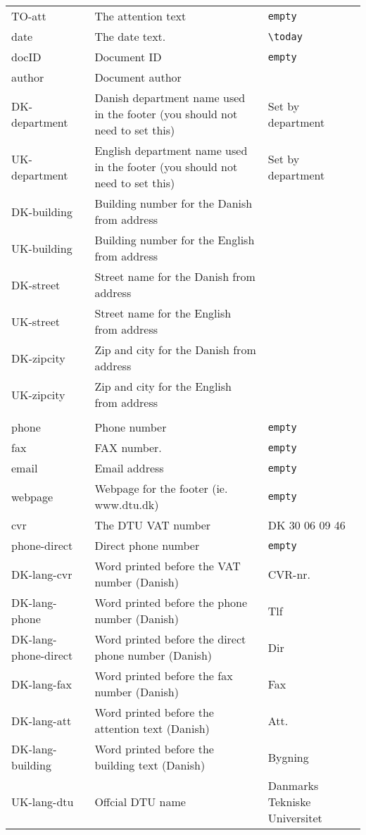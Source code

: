 \documentclass{dtuletter}
\newcommand{\optempty}{{\rmfamily\texttt{empty}}}
\begin{document}
\begin{longtable}{>{\ttfamily}l >{\raggedright}p{} >{\ttfamily}p{}}
TO-att		& The attention text & \optempty\\
date 		& The date text. & \verb,\today,\\
docID  		& Document ID & \optempty\\
author 		& Document author &\optempty\\
DK-department 	& Danish department name used in the footer (you should not need to set this) & Set by department  \\
UK-department 	& English department name used in the footer (you should not need to set this) & Set by department  \\
DK-building 	& Building number for the Danish from address &\optempty\\
UK-building 	& Building number for the English from address &\optempty\\
DK-street 		& Street name for the Danish from address &\optempty\\
UK-street 		& Street name for the English from address &\optempty\\
DK-zipcity 		& Zip and city for the Danish from address &\optempty\\
UK-zipcity 		& Zip and city for the English from address &\optempty\\\\
phone			& Phone number & \optempty\\
fax				& FAX number. & \optempty\\
email 			& Email address & \optempty\\
webpage			& Webpage for the footer (ie. www.dtu.dk) & \optempty\\
cvr 			& The DTU VAT number & DK 30 06 09 46\\
phone-direct	& Direct phone number & \optempty\\
%
%
DK-lang-cvr 			& Word printed before the VAT number (Danish) 			& CVR-nr.  \\
DK-lang-phone 			& Word printed before the phone number (Danish) 		& Tlf      \\
DK-lang-phone-direct 	& Word printed before the direct phone number (Danish) 	& Dir      \\
DK-lang-fax 			& Word printed before the fax number (Danish)			& Fax      \\
DK-lang-att 			& Word printed before the attention text (Danish)		& Att.     \\
DK-lang-building 		& Word printed before the building text (Danish)		& Bygning  \\
UK-lang-dtu				& Offcial DTU name 										& Danmarks Tekniske Universitet\\

\end{longtable}
\end{document}

